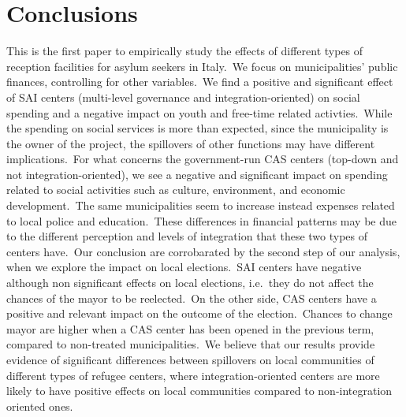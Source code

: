 \documentclass[authoryear,preprint,review,12pt]{elsarticle}
\begin{document}
\section*{Conclusions}

\normalsize

\noindent
This is the first paper to empirically study the effects of different types of reception facilities for asylum seekers in Italy.\ We focus on municipalities' public finances, controlling for other variables.\ We find a positive and significant effect of SAI centers (multi-level governance and integration-oriented) on social spending and a negative impact on youth and free-time related activties.\ While the spending on social services is more than expected, since the municipality is the owner of the project, the spillovers of other functions may have different implications.\ For what concerns the government-run CAS centers (top-down and not integration-oriented), we see a negative and significant impact on spending related to social activities such as culture, environment, and economic development.\ The same municipalities seem to increase instead expenses related to local police and education.\ These differences in financial patterns may be due to the different perception and levels of integration that these two types of centers have.\ Our conclusion are corrobarated by the second step of our analysis, when we explore the impact on local elections.\ SAI centers have negative although non significant effects on local elections, i.e.\ they do not affect the chances of the mayor to be reelected.\ On the other side, CAS centers have a positive and relevant impact on the outcome of the election.\ Chances to change mayor are higher when a CAS center has been opened in the previous term, compared to non-treated municipalities.\ We believe that our results provide evidence of significant differences between spillovers on local communities of different types of refugee centers, where integration-oriented centers are more likely to have positive effects on local communities compared to non-integration oriented ones.\\ 


\end{document}
